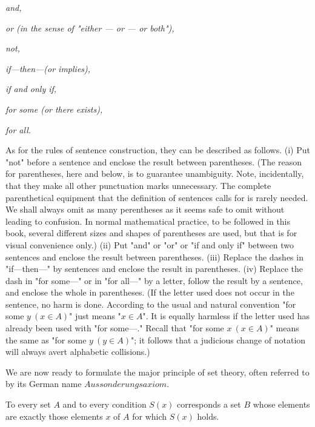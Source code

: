 \begin{description}
\setlength{\itemsep}{-0.4em}
\setlength{\itemindent}{-1.25em\relax}
\item \textit{and,}
\item \textit{or (in the sense of "either — or — or both"), }
\item \textit{not,}
\item \textit{if—then—(or implies),}
\item \textit{if and only if,}
\item \textit{for some (or there exists),}
\item \textit{for all.}
\end{description}

As for the rules of sentence construction, they can be described as follows. (i) Put "not" before a sentence and enclose the result between parentheses. (The reason for parentheses, here and below, is to guarantee unambiguity. Note, incidentally, that they make all other punctuation marks unnecessary. The complete parenthetical equipment that the definition of sentences calls for is rarely needed. We shall always omit as many perentheses as it seems safe to omit without leading to confusion. In normal mathematical practice, to be followed in this book, several different sizes and shapes of parentheses are used, but that is for visual convenience only.) (ii) Put "and" or "or" or "if and only if" between two sentences and enclose the result between parentheses. (iii) Replace the dashes in "if—then—" by sentences and enclose the result in parentheses. (iv) Replace the dash in "for some—" or in "for all—" by a letter, follow the result by a sentence, and enclose the whole in parentheses. (If the letter used does not occur in the sentence, no harm is done. According to the usual and natural convention "for some $y\ (x \in A)$" just means "$ x \in A$". It is equally harmless if the letter used has already been used with "for some—." Recall that "for some $x\ (x \in A)$" means the same as  "for some $y\ (y \in A)$"; it follows that a judicious change of notation will always avert alphabetic collisions.)

We are now ready to formulate the major principle of set theory, often referred to by its German name $Aussonderungsaxiom$. 

\begin{named} To every set $A$ and to every condition $S(x)$ corresponds a set $B$ whose elements are exactly those elements $x$ of $A$ for which $S(x)$ holds.
\end{named}

